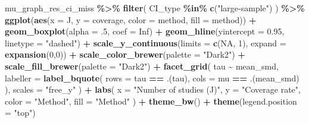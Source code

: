 \documentclass[
]{article}
\newenvironment{Shaded}{\begin{snugshade}}{\end{snugshade}}
\newcommand{\AttributeTok}[1]{\textcolor[rgb]{0.13,0.29,0.53}{#1}}
\newcommand{\ConstantTok}[1]{\textcolor[rgb]{0.56,0.35,0.01}{#1}}
\newcommand{\DecValTok}[1]{\textcolor[rgb]{0.00,0.00,0.81}{#1}}
\newcommand{\FloatTok}[1]{\textcolor[rgb]{0.00,0.00,0.81}{#1}}
\newcommand{\FunctionTok}[1]{\textcolor[rgb]{0.13,0.29,0.53}{\textbf{#1}}}
\newcommand{\NormalTok}[1]{#1}
\newcommand{\SpecialCharTok}[1]{\textcolor[rgb]{0.81,0.36,0.00}{\textbf{#1}}}
\newcommand{\StringTok}[1]{\textcolor[rgb]{0.31,0.60,0.02}{#1}}
\begin{document}
\begin{Shaded}
\begin{Highlighting}[]
\NormalTok{mu\_graph\_res\_ci\_miss }\SpecialCharTok{\%\textgreater{}\%}
  \FunctionTok{filter}\NormalTok{(}
\NormalTok{    CI\_type }\SpecialCharTok{\%in\%} \FunctionTok{c}\NormalTok{(}\StringTok{"large{-}sample"}\NormalTok{)}
\NormalTok{  ) }\SpecialCharTok{\%\textgreater{}\%}
  \FunctionTok{ggplot}\NormalTok{(}\FunctionTok{aes}\NormalTok{(}\AttributeTok{x =}\NormalTok{ J, }\AttributeTok{y =}\NormalTok{ coverage, }\AttributeTok{color =}\NormalTok{ method, }\AttributeTok{fill =}\NormalTok{ method)) }\SpecialCharTok{+}
  \FunctionTok{geom\_boxplot}\NormalTok{(}\AttributeTok{alpha =}\NormalTok{ .}\DecValTok{5}\NormalTok{, }\AttributeTok{coef =} \ConstantTok{Inf}\NormalTok{) }\SpecialCharTok{+}
  \FunctionTok{geom\_hline}\NormalTok{(}\AttributeTok{yintercept =} \FloatTok{0.95}\NormalTok{, }\AttributeTok{linetype =} \StringTok{"dashed"}\NormalTok{) }\SpecialCharTok{+}
  \FunctionTok{scale\_y\_continuous}\NormalTok{(}\AttributeTok{limits =} \FunctionTok{c}\NormalTok{(}\ConstantTok{NA}\NormalTok{, }\DecValTok{1}\NormalTok{), }\AttributeTok{expand =} \FunctionTok{expansion}\NormalTok{(}\DecValTok{0}\NormalTok{,}\DecValTok{0}\NormalTok{)) }\SpecialCharTok{+} 
  \FunctionTok{scale\_color\_brewer}\NormalTok{(}\AttributeTok{palette =} \StringTok{"Dark2"}\NormalTok{) }\SpecialCharTok{+}
  \FunctionTok{scale\_fill\_brewer}\NormalTok{(}\AttributeTok{palette =} \StringTok{"Dark2"}\NormalTok{) }\SpecialCharTok{+}
  \FunctionTok{facet\_grid}\NormalTok{(}
\NormalTok{    tau }\SpecialCharTok{\textasciitilde{}}\NormalTok{ mean\_smd, }
    \AttributeTok{labeller =} \FunctionTok{label\_bquote}\NormalTok{(}
      \AttributeTok{rows =}\NormalTok{ tau }\SpecialCharTok{==}\NormalTok{ .(tau),}
      \AttributeTok{cols =}\NormalTok{ mu }\SpecialCharTok{==}\NormalTok{ .(mean\_smd)}
\NormalTok{    ),}
    \AttributeTok{scales =} \StringTok{"free\_y"}
\NormalTok{  ) }\SpecialCharTok{+}
  \FunctionTok{labs}\NormalTok{(}
    \AttributeTok{x =} \StringTok{"Number of studies (J)"}\NormalTok{, }
    \AttributeTok{y =} \StringTok{"Coverage rate"}\NormalTok{, }
    \AttributeTok{color =} \StringTok{"Method"}\NormalTok{,}
    \AttributeTok{fill =} \StringTok{"Method"}
\NormalTok{  ) }\SpecialCharTok{+} 
  \FunctionTok{theme\_bw}\NormalTok{() }\SpecialCharTok{+}
  \FunctionTok{theme}\NormalTok{(}\AttributeTok{legend.position =} \StringTok{"top"}\NormalTok{)}
\end{Highlighting}
\end{Shaded}
\end{document}
